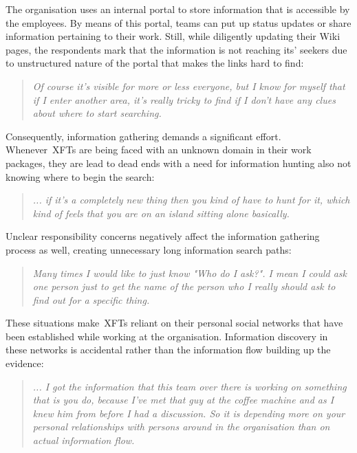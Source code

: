 \begin{description}
   The organisation uses an internal portal to store information that is accessible by the employees. By means of this portal, teams can put up status updates or share information pertaining to their work. Still, while diligently updating their Wiki pages, the respondents mark that the information is not reaching its' seekers due to unstructured nature of the portal that makes the links hard to find:

      \begin{quote}\itshape Of course it's visible for more or less everyone, but I know for myself that if I enter another area, it's really tricky to find if I don't have any clues about where to start searching.
      \end{quote}

   Consequently, information gathering demands a significant effort. Whenever~\acp{XFT} are being faced with an unknown domain in their work packages, they are lead to dead ends with a need for information hunting also not knowing where to begin the search:

      \begin{quote}\itshape ... if it’s a completely new thing then you kind of have to hunt for it, which kind of feels that you are on an island sitting alone basically.
      \end{quote}

   Unclear responsibility concerns negatively affect the information gathering process as well, creating unnecessary long information search paths:

      \begin{quote}\itshape Many times I would like to just know "Who do I ask?". I mean I could ask one person just to get the name of the person who I really should ask to find out for a specific thing.
      \end{quote}
      
   These situations make~\acp{XFT} reliant on their personal social networks that have been established while working at the organisation. Information discovery in these networks is accidental rather than the information flow building up the evidence:

      \begin{quote}\itshape ... I got the information that this team over there is working on something that is you do, because I’ve met that guy at the coffee machine and as I knew him from before I had a discussion. So it is depending more on your personal relationships with persons around in the organisation than on actual information flow.
      \end{quote}


\end{description}
